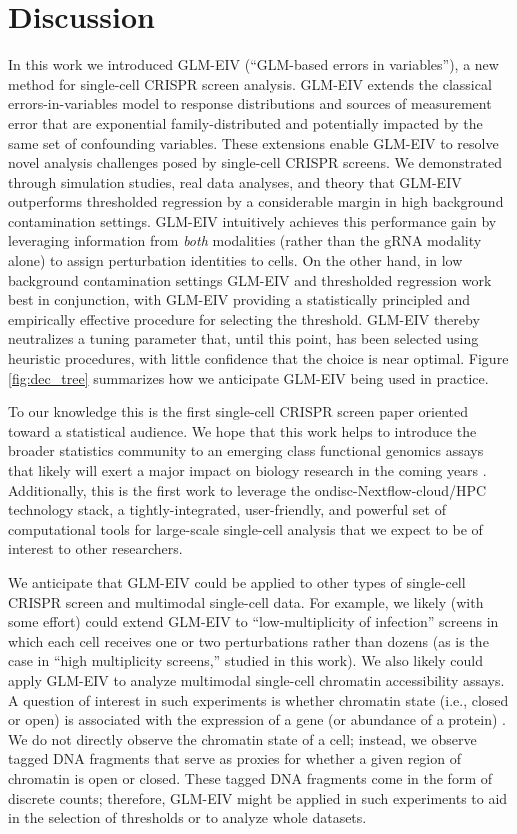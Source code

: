 \documentclass[12pt]{article}
\begin{document}
\section{Discussion}

In this work we introduced GLM-EIV (``GLM-based errors in variables''), a new method for single-cell CRISPR screen analysis. GLM-EIV extends the classical errors-in-variables model to response distributions and sources of measurement error that are exponential family-distributed and potentially impacted by the same set of confounding variables. These extensions enable GLM-EIV to resolve novel analysis challenges posed by single-cell CRISPR screens. We demonstrated through simulation studies, real data analyses, and theory that GLM-EIV outperforms thresholded regression by a considerable margin in high background contamination settings. GLM-EIV intuitively achieves this performance gain by leveraging information from \textit{both} modalities (rather than the gRNA modality alone) to assign perturbation identities to cells. On the other hand, in low background contamination settings GLM-EIV and thresholded regression work best in conjunction, with GLM-EIV providing a statistically principled and empirically effective procedure for selecting the threshold. GLM-EIV thereby neutralizes a tuning parameter that, until this point, has been selected using heuristic procedures, with little confidence that the choice is near optimal. Figure \ref{fig:dec_tree} summarizes how we anticipate GLM-EIV being used in practice.

To our knowledge this is the first single-cell CRISPR screen paper oriented toward a statistical audience. We hope that this work helps to introduce the broader statistics community to an emerging class functional genomics assays that likely will exert a major impact on biology research in the coming years \cite{Przybyla2021}. Additionally, this is the first work to leverage the ondisc-Nextflow-cloud/HPC technology stack, a tightly-integrated, user-friendly, and powerful set of computational tools for large-scale single-cell analysis that we expect to be of interest to other researchers.

We anticipate that GLM-EIV could be applied to other types of single-cell CRISPR screen and multimodal single-cell data. For example, we likely (with some effort) could extend GLM-EIV to ``low-multiplicity of infection'' screens \cite{Schraivogel2020} in which each cell receives one or two perturbations rather than dozens (as is the case in ``high multiplicity screens,'' studied in this work). We also likely could apply GLM-EIV to analyze multimodal single-cell chromatin accessibility assays. A question of interest in such experiments is whether chromatin state (i.e., closed or open) is associated with the expression of a gene (or abundance of a protein) \cite{Mimitou2021}. We do not directly observe the chromatin state of a cell; instead, we observe tagged DNA fragments that serve as proxies for whether a given region of chromatin is open or closed. These tagged DNA fragments come in the form of discrete counts; therefore, GLM-EIV might be applied in such experiments to aid in the selection of thresholds or to analyze whole datasets. 
\end{document}

